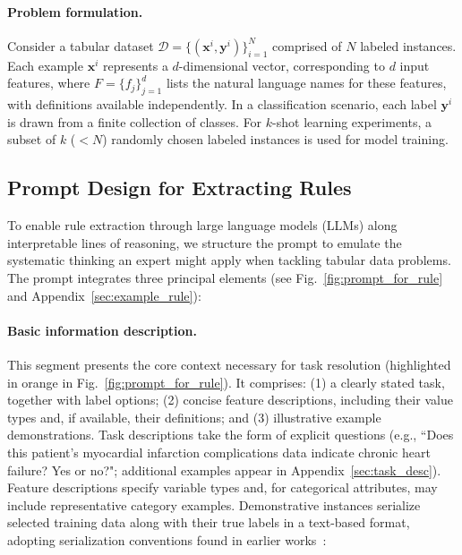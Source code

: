 \vspace*{-0.12in}
\paragraph{Problem formulation.} Consider a tabular dataset $\mathcal{D} = \{(\mathbf{x}^i, \mathbf{y}^i)\}_{i=1}^{N}$ comprised of $N$ labeled instances. Each example $\mathbf{x}^i$ represents a $d$-dimensional vector, corresponding to $d$ input features, where $F = \{f_j\}_{j=1}^{d}$ lists the natural language names for these features, with definitions available independently. In a classification scenario, each label $\mathbf{y}^i$ is drawn from a finite collection of classes. For $k$-shot learning experiments, a subset of $k$ ($<N$) randomly chosen labeled instances is used for model training.

\subsection{Prompt Design for Extracting Rules}
\label{Sec:prompt_design}
To enable rule extraction through large language models (LLMs) along interpretable lines of reasoning, we structure the prompt to emulate the systematic thinking an expert might apply when tackling tabular data problems. The prompt integrates three principal elements (see Fig.~\ref{fig:prompt_for_rule} and Appendix~\ref{sec:example_rule}):

\vspace*{-0.12in}
\paragraph{Basic information description.} This segment presents the core context necessary for task resolution (highlighted in orange in Fig.~\ref{fig:prompt_for_rule}). It comprises: (1) a clearly stated task, together with label options; (2) concise feature descriptions, including their value types and, if available, their definitions; and (3) illustrative example demonstrations. Task descriptions take the form of explicit questions (e.g., ``Does this patient's myocardial infarction complications data indicate chronic heart failure? Yes or no?"; additional examples appear in Appendix~\ref{sec:task_desc}). Feature descriptions specify variable types and, for categorical attributes, may include representative category examples. Demonstrative instances serialize selected training data along with their true labels in a text-based format, adopting serialization conventions found in earlier works~\cite{dinh2022lift,hegselmann2023tabllm}:

